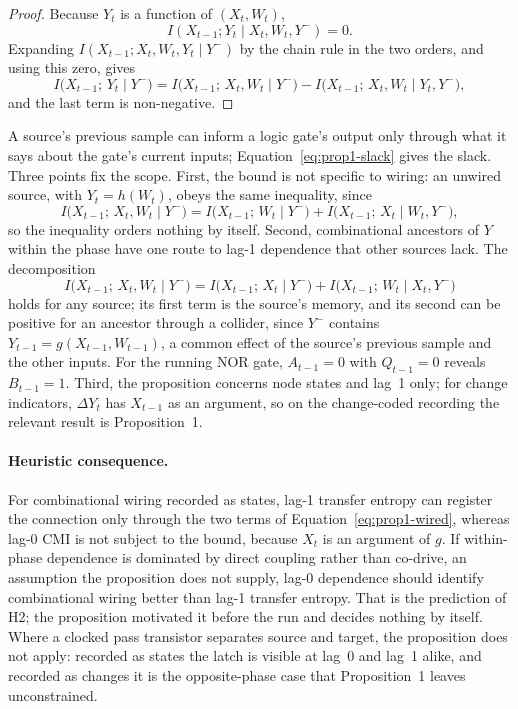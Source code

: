 \begin{proof}
Because $Y_t$ is a function of $(X_t, W_t)$,
\[
  I(X_{t-1}; Y_t \mid X_t, W_t, Y^-) = 0.
\]
Expanding $I(X_{t-1}; X_t, W_t, Y_t \mid Y^-)$ by the chain rule in the two orders, and using this zero, gives
\begin{equation}
  I\big(X_{t-1};\,Y_t \mid Y^-\big) = I\big(X_{t-1};\,X_t, W_t \mid Y^-\big) - I\big(X_{t-1};\,X_t, W_t \mid Y_t, Y^-\big),
  \label{eq:prop1-slack}
\end{equation}
and the last term is non-negative.
\end{proof}

A source's previous sample can inform a logic gate's output only through what it says about the gate's current inputs; Equation~\eqref{eq:prop1-slack} gives the slack. Three points fix the scope. First, the bound is not specific to wiring: an unwired source, with $Y_t = h(W_t)$, obeys the same inequality, since
\begin{equation}
  I\big(X_{t-1};\,X_t, W_t \mid Y^-\big) = I\big(X_{t-1};\,W_t \mid Y^-\big) + I\big(X_{t-1};\,X_t \mid W_t, Y^-\big),
  \label{eq:prop1-unwired}
\end{equation}
so the inequality orders nothing by itself. Second, combinational ancestors of $Y$ within the phase have one route to lag-1 dependence that other sources lack. The decomposition
\begin{equation}
  I\big(X_{t-1};\,X_t, W_t \mid Y^-\big) = I\big(X_{t-1};\,X_t \mid Y^-\big) + I\big(X_{t-1};\,W_t \mid X_t, Y^-\big)
  \label{eq:prop1-wired}
\end{equation}
holds for any source; its first term is the source's memory, and its second can be positive for an ancestor through a collider, since $Y^-$ contains $Y_{t-1} = g(X_{t-1}, W_{t-1})$, a common effect of the source's previous sample and the other inputs. For the running NOR gate, $A_{t-1} = 0$ with $Q_{t-1} = 0$ reveals $B_{t-1} = 1$. Third, the proposition concerns node states and lag~1 only; for change indicators, $\Delta Y_t$ has $X_{t-1}$ as an argument, so on the change-coded recording the relevant result is Proposition~1.

\paragraph{Heuristic consequence.} For combinational wiring recorded as states, lag-1 transfer entropy can register the connection only through the two terms of Equation~\eqref{eq:prop1-wired}, whereas lag-0 CMI is not subject to the bound, because $X_t$ is an argument of $g$. If within-phase dependence is dominated by direct coupling rather than co-drive, an assumption the proposition does not supply, lag-0 dependence should identify combinational wiring better than lag-1 transfer entropy. That is the prediction of H2; the proposition motivated it before the run and decides nothing by itself. Where a clocked pass transistor separates source and target, the proposition does not apply: recorded as states the latch is visible at lag~0 and lag~1 alike, and recorded as changes it is the opposite-phase case that Proposition~1 leaves unconstrained.

